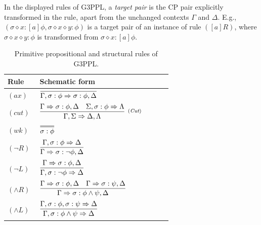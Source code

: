 \documentclass[manuscript,screen]{acmart}
\newcommand{\cat}[0]{\diamond}
\newcommand{\GiiiPPL}[0]{\mbox{G3PPL}}
\begin{document}
\ifx
In the displayed rules of \GiiiPPL, a \emph{target pair} is the CP pair explicitly transformed in the rule, apart from the unchanged contexts $\Gamma$ and $\Delta$. E.g., $(\sigma\cat x : [a]\phi, \sigma\cat x\cat y:\phi)$ is a target pair of an instance of rule $([a]R)$, where $\sigma\cat x\cat y:\phi$ is transformed from $\sigma\cat x : [a]\phi$. 
\fi

\begin{table}[t]
\centering
\small
\begin{tabular}{p{0.18\linewidth}p{0.74\linewidth}}
\toprule
Rule & Schematic form \\
\midrule
$(\textit{ax})$ & $\begin{aligned}\infer[]{\Gamma,\sigma:\phi\Rightarrow\sigma:\phi,\Delta}{}\end{aligned}$\\[1.2em]
$(\textit{cut})$ &
         $
         \begin{aligned}
         \infer[^{(\textit{Cut})}]
         {\Gamma, \Sigma\Rightarrow \Delta, \Lambda}
         {\Gamma\Rightarrow \sigma : \phi, \Delta & 
         \Sigma, \sigma : \phi\Rightarrow \Lambda}
         \end{aligned}
         $\\[1.2em]
$(\textit{wk})$ & $\begin{aligned}\infer=[]{\sigma:\phi}{}\end{aligned}$\\[1.2em]
$(\neg R)$ & $\begin{aligned}\infer[]{\Gamma\Rightarrow\sigma:\neg\phi,\Delta}{\Gamma,\sigma:\phi\Rightarrow\Delta}\end{aligned}$\\[1.2em]
$(\neg L)$ & $\begin{aligned}\infer[]{\Gamma,\sigma:\neg\phi\Rightarrow\Delta}{\Gamma\Rightarrow\sigma:\phi,\Delta}\end{aligned}$\\[1.2em]
$(\wedge R)$ & $\begin{aligned}\infer[]{\Gamma\Rightarrow\sigma:\phi\wedge\psi,\Delta}{\Gamma\Rightarrow\sigma:\phi,\Delta & \Gamma\Rightarrow\sigma:\psi,\Delta}\end{aligned}$\\[1.2em]
$(\wedge L)$ & $\begin{aligned}\infer[]{\Gamma,\sigma:\phi\wedge\psi\Rightarrow\Delta}{\Gamma,\sigma:\phi,\sigma:\psi\Rightarrow\Delta}\end{aligned}$\\
\bottomrule
\end{tabular}
\caption{Primitive propositional and structural rules of \GiiiPPL.}
\label{table:giiippl-propositional-rules}
\end{table}
\end{document}
